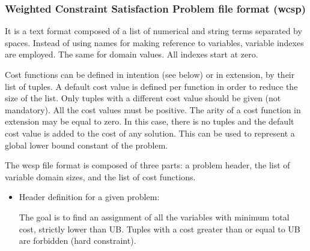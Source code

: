 \documentclass[letterpaper,10pt,openany,oneside,english]{sphinxmanual}
\begin{document}
\sphinxstepscope


\subsubsection{Weighted Constraint Satisfaction Problem file format (wcsp)}
\label{\detokenize{formats/wcspformat:weighted-constraint-satisfaction-problem-file-format-wcsp}}\label{\detokenize{formats/wcspformat:wcsp-format}}\label{\detokenize{formats/wcspformat::doc}}

\begin{fulllineitems}

\pysigstartsignatures
{}
\pysigstopsignatures
\sphinxAtStartPar
It is a text format composed of a list of numerical and string terms separated by spaces. Instead of using names for making reference to variables, variable indexes are employed. The same for domain values. All indexes start at zero.

\sphinxAtStartPar
Cost functions can be defined in intention (see below) or in extension, by their list of tuples. A default cost value is defined per function in order to reduce the size of the list. Only tuples with a different cost value should be given (not mandatory). All the cost values must be positive. The arity of a cost function in extension may be equal to zero. In this case, there is no tuples and the default cost value is added to the cost of any solution. This can be used to represent a global lower bound constant of the problem.

\sphinxAtStartPar
The wcsp file format is composed of three parts: a problem header, the list of variable domain sizes, and the list of cost functions.

\sphinxAtStartPar
\begin{itemize}
\item {} 
\sphinxAtStartPar
Header definition for a given problem: 
\begin{sphinxVerbatim}[commandchars=\\\{\}]
 
   
  
   
       
\end{sphinxVerbatim}
 The goal is to find an assignment of all the variables with minimum total cost, strictly lower than UB. Tuples with a cost greater than or equal to UB are forbidden (hard constraint).


\end{itemize}
\end{fulllineitems}
\end{document}
